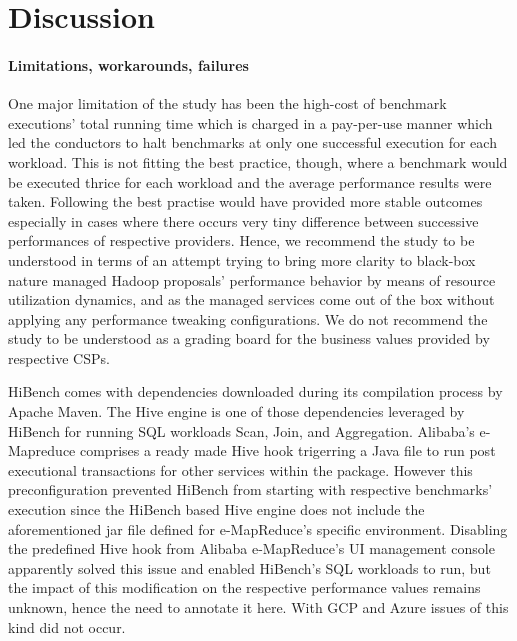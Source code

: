 \documentclass[review]{elsarticle}
\begin{document}
\section{Discussion}
\paragraph{Limitations, workarounds, failures}One major limitation of the study has been the high-cost of benchmark executions' total running time which is charged in a pay-per-use manner which led the conductors to halt benchmarks at only one successful execution for each workload. This is not fitting the best practice, though, where a benchmark would be executed thrice for each workload and the average performance results were taken. Following the best practise would have provided more stable outcomes especially in cases where there occurs very tiny difference between successive performances of respective providers. Hence, we recommend the study to be understood in terms of an attempt trying to bring more clarity to black-box nature managed Hadoop proposals' performance behavior by means of resource utilization dynamics, and as the managed services come out of the box without applying any performance tweaking configurations. We do not recommend the study to be understood as a grading board for the business values provided by respective CSPs.

HiBench comes with dependencies downloaded during its compilation process by Apache Maven. The Hive engine is one of those dependencies leveraged by HiBench for running SQL workloads Scan, Join, and Aggregation. Alibaba's e-Mapreduce comprises a ready made Hive hook trigerring a Java file to run post executional transactions for other services within the package. However this preconfiguration prevented HiBench from starting with respective benchmarks' execution since the HiBench based Hive engine does not include the aforementioned jar file defined for e-MapReduce's specific environment. Disabling the predefined Hive hook from Alibaba e-MapReduce's UI management console apparently solved this issue and enabled HiBench's SQL workloads to run, but the impact of this modification on the respective performance values remains unknown, hence the need to annotate it here. With GCP and Azure issues of this kind did not occur.
\end{document}
